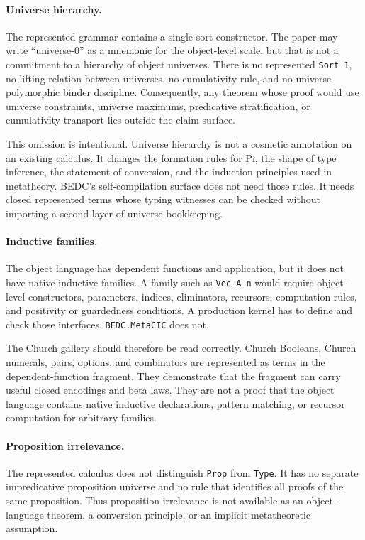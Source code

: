 \paragraph{Universe hierarchy.}
The represented grammar contains a single sort constructor.  The paper may
write ``universe-$0$'' as a mnemonic for the object-level scale, but that is
not a commitment to a hierarchy of object universes.  There is no represented
\texttt{Sort 1}, no lifting relation between universes, no cumulativity rule,
and no universe-polymorphic binder discipline.  Consequently, any theorem
whose proof would use universe constraints, universe maximums, predicative
stratification, or cumulativity transport lies outside the claim surface.

This omission is intentional.  Universe hierarchy is not a cosmetic
annotation on an existing calculus.  It changes the formation rules for Pi,
the shape of type inference, the statement of conversion, and the induction
principles used in metatheory.  BEDC's self-compilation surface does not need
those rules.  It needs closed represented terms whose typing witnesses can be
checked without importing a second layer of universe bookkeeping.

\paragraph{Inductive families.}
The object language has dependent functions and application, but it does not
have native inductive families.  A family such as \texttt{Vec A n} would
require object-level constructors, parameters, indices, eliminators,
recursors, computation rules, and positivity or guardedness conditions.  A
production kernel has to define and check those interfaces.  \texttt{BEDC.MetaCIC}
does not.

The Church gallery should therefore be read correctly.  Church Booleans,
Church numerals, pairs, options, and combinators are represented as terms in
the dependent-function fragment.  They demonstrate that the fragment can
carry useful closed encodings and beta laws.  They are not a proof that the
object language contains native inductive declarations, pattern matching, or
recursor computation for arbitrary families.

\paragraph{Proposition irrelevance.}
The represented calculus does not distinguish \texttt{Prop} from
\texttt{Type}.  It has no separate impredicative proposition universe and no
rule that identifies all proofs of the same proposition.  Thus proposition
irrelevance is not available as an object-language theorem, a conversion
principle, or an implicit metatheoretic assumption.

